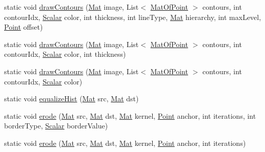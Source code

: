 \begin{DoxyCompactItemize}
\item 
static void \mbox{\hyperlink{classorg_1_1opencv_1_1imgproc_1_1_imgproc_aaf689993f59f9920d22624e2672e9bc1}{draw\+Contours}} (\mbox{\hyperlink{classorg_1_1opencv_1_1core_1_1_mat}{Mat}} image, List$<$ \mbox{\hyperlink{classorg_1_1opencv_1_1core_1_1_mat_of_point}{Mat\+Of\+Point}} $>$ contours, int contour\+Idx, \mbox{\hyperlink{classorg_1_1opencv_1_1core_1_1_scalar}{Scalar}} color, int thickness, int line\+Type, \mbox{\hyperlink{classorg_1_1opencv_1_1core_1_1_mat}{Mat}} hierarchy, int max\+Level, \mbox{\hyperlink{classorg_1_1opencv_1_1core_1_1_point}{Point}} offset)
\item 
static void \mbox{\hyperlink{classorg_1_1opencv_1_1imgproc_1_1_imgproc_a36480a8bc172c736bb663d4e906a8195}{draw\+Contours}} (\mbox{\hyperlink{classorg_1_1opencv_1_1core_1_1_mat}{Mat}} image, List$<$ \mbox{\hyperlink{classorg_1_1opencv_1_1core_1_1_mat_of_point}{Mat\+Of\+Point}} $>$ contours, int contour\+Idx, \mbox{\hyperlink{classorg_1_1opencv_1_1core_1_1_scalar}{Scalar}} color, int thickness)
\item 
static void \mbox{\hyperlink{classorg_1_1opencv_1_1imgproc_1_1_imgproc_ac89674f3f896a672c8ed20be07e83e0e}{draw\+Contours}} (\mbox{\hyperlink{classorg_1_1opencv_1_1core_1_1_mat}{Mat}} image, List$<$ \mbox{\hyperlink{classorg_1_1opencv_1_1core_1_1_mat_of_point}{Mat\+Of\+Point}} $>$ contours, int contour\+Idx, \mbox{\hyperlink{classorg_1_1opencv_1_1core_1_1_scalar}{Scalar}} color)
\item 
static void \mbox{\hyperlink{classorg_1_1opencv_1_1imgproc_1_1_imgproc_a54ffba160b6fca43023f2d5f556e9b74}{equalize\+Hist}} (\mbox{\hyperlink{classorg_1_1opencv_1_1core_1_1_mat}{Mat}} src, \mbox{\hyperlink{classorg_1_1opencv_1_1core_1_1_mat}{Mat}} dst)
\item 
static void \mbox{\hyperlink{classorg_1_1opencv_1_1imgproc_1_1_imgproc_addf44b4eae2f6a52e93c1018cdb07ddc}{erode}} (\mbox{\hyperlink{classorg_1_1opencv_1_1core_1_1_mat}{Mat}} src, \mbox{\hyperlink{classorg_1_1opencv_1_1core_1_1_mat}{Mat}} dst, \mbox{\hyperlink{classorg_1_1opencv_1_1core_1_1_mat}{Mat}} kernel, \mbox{\hyperlink{classorg_1_1opencv_1_1core_1_1_point}{Point}} anchor, int iterations, int border\+Type, \mbox{\hyperlink{classorg_1_1opencv_1_1core_1_1_scalar}{Scalar}} border\+Value)
\item 
static void \mbox{\hyperlink{classorg_1_1opencv_1_1imgproc_1_1_imgproc_a3fda166b23a9211a4c6831f15851cd28}{erode}} (\mbox{\hyperlink{classorg_1_1opencv_1_1core_1_1_mat}{Mat}} src, \mbox{\hyperlink{classorg_1_1opencv_1_1core_1_1_mat}{Mat}} dst, \mbox{\hyperlink{classorg_1_1opencv_1_1core_1_1_mat}{Mat}} kernel, \mbox{\hyperlink{classorg_1_1opencv_1_1core_1_1_point}{Point}} anchor, int iterations)

\end{DoxyCompactItemize}
